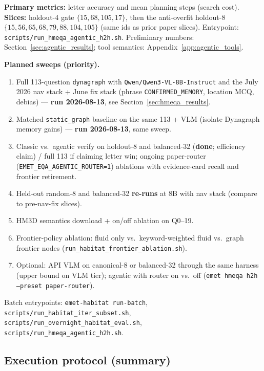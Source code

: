 \textbf{Primary metrics:} letter accuracy and mean planning steps (search cost).
\textbf{Slices:} holdout-4 gate $\{15,68,105,17\}$, then the anti-overfit holdout-8 $\{15,56,65,68,79,88,104,105\}$ (same ids as prior paper slices).
Entrypoint: \texttt{scripts/run\_hmeqa\_agentic\_h2h.sh}.
Preliminary numbers: Section~\ref{sec:agentic_results}; tool semantics: Appendix~\ref{app:agentic_tools}.

\textbf{Planned sweeps (priority).}
\begin{enumerate}
  \item Full 113-question \texttt{dynagraph} with \texttt{Qwen/Qwen3-VL-8B-Instruct} and the July 2026 nav stack + June fix stack (phrase \texttt{CONFIRMED\_MEMORY}, location MCQ, debias) --- \textbf{run 2026-08-13}, see Section~\ref{sec:hmeqa_results}.
  \item Matched \texttt{static\_graph} baseline on the same 113 + VLM (isolate Dynagraph memory gains) --- \textbf{run 2026-08-13}, same sweep.
  \item Classic vs.\ agentic verify on holdout-8 and balanced-32 (\textbf{done}; efficiency claim) / full 113 if claiming letter win; ongoing paper-router (\texttt{EMET\_EQA\_AGENTIC\_ROUTER=1}) ablations with evidence-card recall and frontier retirement.
  \item Held-out random-8 and balanced-32 \textbf{re-runs} at 8B with nav stack (compare to pre-nav-fix slices).
  \item HM3D semantics download + on/off ablation on Q0--19.
  \item Frontier-policy ablation: fluid only vs.\ keyword-weighted fluid vs.\ graph frontier nodes (\texttt{run\_habitat\_frontier\_ablation.sh}).
  \item Optional: API VLM on canonical-8 or balanced-32 through the same harness (upper bound on VLM tier); agentic with router on vs.\ off (\texttt{emet hmeqa h2h --preset paper-router}).
\end{enumerate}

Batch entrypoints: \texttt{emet-habitat run-batch}, \texttt{scripts/run\_habitat\_iter\_subset.sh}, \texttt{scripts/run\_overnight\_habitat\_eval.sh}, \texttt{scripts/run\_hmeqa\_agentic\_h2h.sh}.

\subsection{Execution protocol (summary)}

